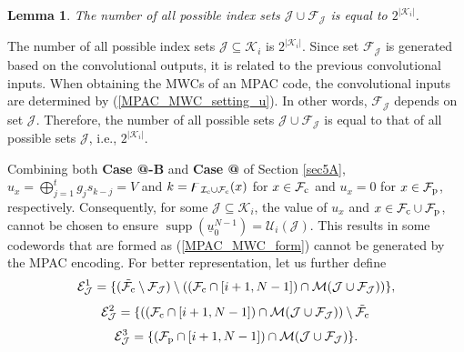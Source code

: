 \documentclass[12pt, draftclsnofoot, peerreview, onecolumn]{IEEEtran}
\makeatletter
\theoremstyle{noparent}
\newtheorem{lemma}[theorem]{\textbf{Lemma}}
\newcommand{\Rmnum}[1]{\expandafter\@slowromancap\romannumeral #1@}
\renewenvironment{proof}[1][\proofname]{\par
  \pushQED{\qed}
  \normalfont \topsep6\p@\@plus6\p@\relax
  \trivlist
  \item[\hskip\labelsep
        \itshape
    #1\@addpunct{:}]\ignorespaces
}{
  \popQED\endtrivlist\@endpefalse
}
\DeclareMathOperator\supp{supp}
\makeatother
\begin{document}
\begin{lemma}
    \label{lemma_MPAC_upper_bound}
    The number of all possible index sets  $\mathcal{J} \cup \mathcal{F}_\mathcal{J}$ is equal to $2^{\left|\mathcal{K}_{i}\right|}$.
\end{lemma}

\begin{proof}[\hspace{1.5em}Proof]
    The number of all possible index sets $\mathcal{J}\subseteq\mathcal{K}_i$ 
    is $2^{\left|\mathcal{K}_{i}\right|}$.
    Since set $\mathcal{F}_\mathcal{J}$ is generated based on the 
    convolutional outputs, it is related to the previous convolutional inputs.
    When obtaining the MWCs of an MPAC code, the convolutional inputs are 
    determined by (\ref{MPAC_MWC_setting_u}).
    In other words, $\mathcal{F}_\mathcal{J}$ depends on set $\mathcal{J}$.
    Therefore, the number of all possible sets $\mathcal{J} \cup \mathcal{F}_\mathcal{J}$ 
    is equal to that of all possible sets $\mathcal{J}$, 
    i.e., $2^{\left|\mathcal{K}_{i}\right|}$.
\end{proof}



Combining both \textbf{Case \Rmnum{1}-B} and \textbf{Case \Rmnum{3}} of Section \ref{sec5A},
$u_x=\bigoplus_{j=1}^{t} g_{j} s_{k-j}=V$ and
$k=\digamma_{\mathcal{I}_{\rm c} \cup \mathcal{F}_{\rm c}}(x)$ for $x\in \mathcal{F}_{\rm c}$ 
and $u_x=0$ for $x\in \mathcal{F}_{\rm p}$, respectively.
Consequently, for some $\mathcal{J}\subseteq\mathcal{K}_i$,
the value of $u_x$ and $x\in \mathcal{F}_{\rm c}\cup \mathcal{F}_{\rm p}$, cannot be chosen to ensure
$\supp({\underline{u}_0^{N-1}})=\mathcal{U}_i(\mathcal{J})$.
This results in some codewords that are formed as (\ref{MPAC_MWC_form}) 
cannot be generated by the MPAC encoding.
For better representation, let us further define
$$\mathcal{E}_{\mathcal{J}}^{1}=\{(\tilde{\mathcal{F}_{\rm c}}\setminus\mathcal{F}_{\mathcal{J}}) \setminus 
((\mathcal{F}_{\rm c}\cap[i+1,N-1])\cap\mathcal{M}(\mathcal{J} \cup \mathcal{F}_\mathcal{J}))\},$$
$$ \mathcal{E}_{\mathcal{J}}^{2}=\{((\mathcal{F}_{\rm c}\cap[i+1,N-1])\cap\mathcal{M}(\mathcal{J} \cup \mathcal{F}_\mathcal{J})) 
\setminus \tilde{\mathcal{F}_{\rm c}}\, $$
$$\mathcal{E}_{\mathcal{J}}^{3}=\{(\mathcal{F}_{\rm p}\cap[i+1,N-1])\cap\mathcal{M}(\mathcal{J} \cup \mathcal{F}_\mathcal{J})\}.$$ 
\end{document}
